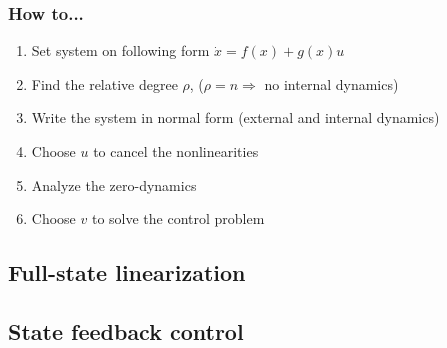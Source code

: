 \subsubsection{How to...}
\begin{enumerate}
	\item Set system on following form $\dot{x} = f(x)+g(x)u$
	\item Find the relative degree $\rho$, ($\rho = n \Rightarrow$ no internal dynamics)
	\item Write the system in normal form (external and internal dynamics)
	\item Choose $u$ to cancel the nonlinearities
	\item Analyze the zero-dynamics
	\item Choose $v$ to solve the control problem
\end{enumerate}

\subsection{Full-state linearization}

\subsection{State feedback control}


